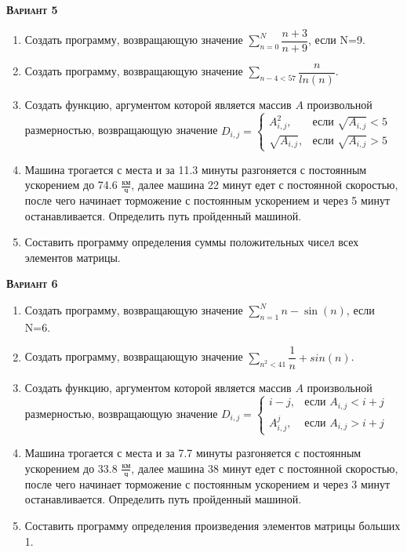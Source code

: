 \textsc{\textbf{Вариант 5}}
\begin{enumerate}
\item  Создать программу, возвращающую значение $\sum\limits_{n=0}^{N} \dfrac{n+3}{n+9}              $, если N=9. 
\item  Создать программу, возвращающую значение $\sum\limits_{n-4<      57} \dfrac{n}{ln(n)}              $. 
\item Создать функцию, аргументом которой является массив $A$ произвольной размерностью, возвращающую значение $D_{i,j}=\begin{cases} A_{i,j}^2, & \text{если } \sqrt{A_{i,j}}<5 \\ \sqrt{A_{i,j}}, & \text{если } \sqrt{A_{i,j}}>5 \end{cases}              $ 
\item Машина трогается с места и за 11.3 минуты разгоняется с постоянным ускорением до 74.6 ${\frac{км}{ч}}$, далее машина   22 минут едет с постоянной скоростью, после чего начинает торможение с постоянным ускорением и через   5 минут останавливается. Определить путь пройденный машиной.  \item Составить программу определения суммы положительных чисел всех элементов матрицы.                                                                                                                                                                                              

\end{enumerate}
\textsc{\textbf{Вариант 6}}
\begin{enumerate}
\item  Создать программу, возвращающую значение $\sum\limits_{n=1}^{N} n-\sin(n)                     $, если N=6. 
\item  Создать программу, возвращающую значение $\sum\limits_{n^2<      41} {\dfrac{1}{n} +sin(n)}        $. 
\item Создать функцию, аргументом которой является массив $A$ произвольной размерностью, возвращающую значение $D_{i,j}=\begin{cases} i-j, & \text{если } {A_{i,j}}<i+j \\  A_{i,j}^j, & \text{если } {A_{i,j}}>i+j \end{cases}                              $ 
\item Машина трогается с места и за  7.7 минуты разгоняется с постоянным ускорением до 33.8 ${\frac{км}{ч}}$, далее машина   38 минут едет с постоянной скоростью, после чего начинает торможение с постоянным ускорением и через   3 минут останавливается. Определить путь пройденный машиной.  \item Составить программу определения произведения элементов матрицы больших 1.                                                                                                                                                                                                              

\end{enumerate}
